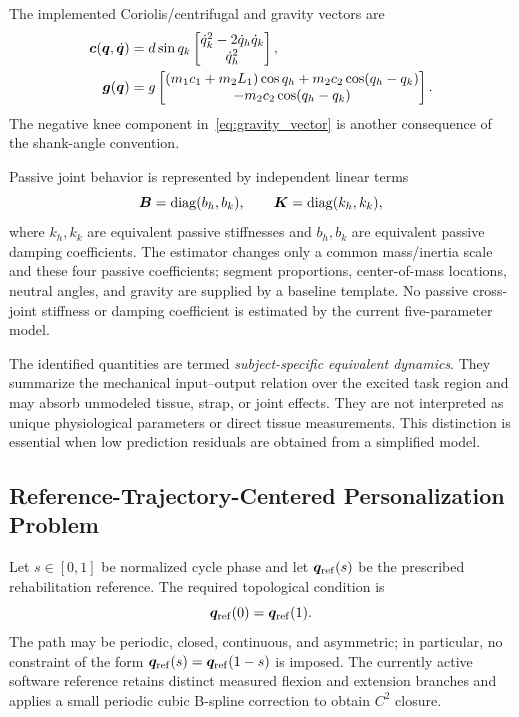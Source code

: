 The implemented Coriolis/centrifugal and gravity vectors are
\begin{align}
    \bm{c}(\bm{q},\dot{\bm{q}})
    &=d\sin q_k
    \begin{bmatrix}
      \dot q_k^2-2\dot q_h\dot q_k\\
      \dot q_h^2
    \end{bmatrix},
    \label{eq:coriolis_vector}\\
    \bm{g}(\bm{q})
    &=g
    \begin{bmatrix}
    (m_1c_1+m_2L_1)\cos q_h+m_2c_2\cos(q_h-q_k)\\
    -m_2c_2\cos(q_h-q_k)
    \end{bmatrix}.
    \label{eq:gravity_vector}
\end{align}
The negative knee component in~\eqref{eq:gravity_vector} is another consequence
of the shank-angle convention.

Passive joint behavior is represented by independent linear terms
\begin{equation}
    \bm{B}=\operatorname{diag}(b_h,b_k),\qquad
    \bm{K}=\operatorname{diag}(k_h,k_k),
    \label{eq:passive_terms}
\end{equation}
where $k_h,k_k$ are equivalent passive stiffnesses and $b_h,b_k$ are
equivalent passive damping coefficients.  The estimator changes only a common
mass/inertia scale and these four passive coefficients; segment proportions,
center-of-mass locations, neutral angles, and gravity are supplied by a
baseline template.  No passive cross-joint stiffness or damping coefficient is
estimated by the current five-parameter model.

The identified quantities are termed \emph{subject-specific equivalent
dynamics}.  They summarize the mechanical input--output relation over the
excited task region and may absorb unmodeled tissue, strap, or joint effects.
They are not interpreted as unique physiological parameters or direct tissue
measurements.  This distinction is essential when low prediction residuals are
obtained from a simplified model.

\subsection{Reference-Trajectory-Centered Personalization Problem}
\label{subsec:personalization_problem}

Let $s\in[0,1]$ be normalized cycle phase and let
$\bm{q}_{\mathrm{ref}}(s)$ be the prescribed rehabilitation reference.  The
required topological condition is
\begin{equation}
    \bm{q}_{\mathrm{ref}}(0)=\bm{q}_{\mathrm{ref}}(1).
    \label{eq:reference_closure}
\end{equation}
The path may be periodic, closed, continuous, and asymmetric; in particular,
no constraint of the form
$\bm{q}_{\mathrm{ref}}(s)=\bm{q}_{\mathrm{ref}}(1-s)$ is imposed.  The
currently active software reference retains distinct measured flexion and
extension branches and applies a small periodic cubic B-spline correction to
obtain $C^2$ closure.

